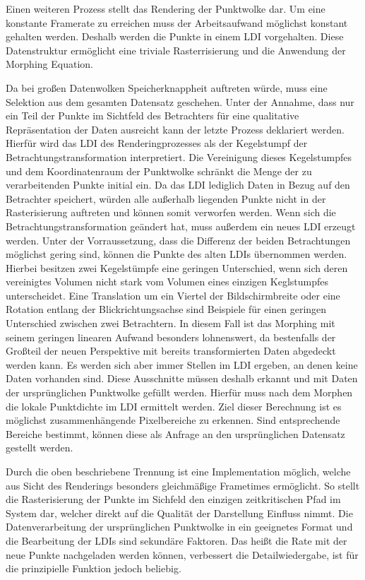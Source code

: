 \documentclass[hyperref, beleg, german]{cgvpub}
\begin{document}
Einen weiteren Prozess stellt das Rendering der Punktwolke dar. Um eine
konstante Framerate zu erreichen muss der Arbeitsaufwand möglichst konstant
gehalten werden. Deshalb werden die Punkte in einem LDI vorgehalten. Diese
Datenstruktur ermöglicht eine triviale Rasterrisierung und die Anwendung der
Morphing Equation.

Da bei großen Datenwolken Speicherknappheit auftreten würde, muss eine
Selektion aus dem gesamten Datensatz geschehen. Unter der Annahme, dass nur ein
Teil der Punkte im Sichtfeld des Betrachters für eine qualitative
Repräsentation der Daten ausreicht kann der letzte Prozess deklariert werden.
Hierfür wird das LDI des Renderingprozesses als der Kegelstumpf der
Betrachtungstransformation interpretiert. Die Vereinigung dieses Kegelstumpfes
und dem Koordinatenraum der Punktwolke schränkt die Menge der zu verarbeitenden
Punkte initial ein. Da das LDI lediglich Daten in Bezug auf den Betrachter
speichert, würden alle außerhalb liegenden Punkte nicht in der Rasterisierung
auftreten und können somit verworfen werden. Wenn sich die
Betrachtungstransformation geändert hat, muss außerdem ein neues LDI erzeugt
werden. Unter der Vorraussetzung, dass die Differenz der beiden Betrachtungen
möglichst gering sind, können die Punkte des alten LDIs übernommen werden.
Hierbei besitzen zwei Kegelstümpfe eine geringen Unterschied, wenn sich deren
vereinigtes Volumen nicht stark vom Volumen eines einzigen Keglstumpfes
unterscheidet. Eine Translation um ein Viertel der Bildschirmbreite oder eine
Rotation entlang der Blickrichtungsachse sind Beispiele für einen geringen
Unterschied zwischen zwei Betrachtern. In diesem Fall ist das Morphing mit
seinem geringen linearen Aufwand besonders lohnenswert, da bestenfalls der
Großteil der neuen Perspektive mit bereits transformierten Daten abgedeckt
werden kann. Es werden sich aber immer Stellen im LDI ergeben, an denen keine
Daten vorhanden sind. Diese Ausschnitte müssen deshalb erkannt und mit Daten
der ursprünglichen Punktwolke gefüllt werden. Hierfür muss nach dem Morphen die
lokale Punktdichte im LDI ermittelt werden. Ziel dieser Berechnung ist es
möglichst zusammenhängende Pixelbereiche zu erkennen. Sind entsprechende
Bereiche bestimmt, können diese als Anfrage an den ursprünglichen Datensatz
gestellt werden.

Durch die oben beschriebene Trennung ist eine Implementation möglich, welche
aus Sicht des Renderings besonders gleichmäßige Frametimes ermöglicht. So
stellt die Rasterisierung der Punkte im Sichfeld den einzigen zeitkritischen
Pfad im System dar, welcher direkt auf die Qualität der Darstellung Einfluss
nimmt. Die Datenverarbeitung der ursprünglichen Punktwolke in ein geeignetes
Format und die Bearbeitung der LDIs sind sekundäre Faktoren. Das heißt die Rate
mit der neue Punkte nachgeladen werden können, verbessert die Detailwiedergabe,
ist für die prinzipielle Funktion jedoch beliebig.
\end{document}
